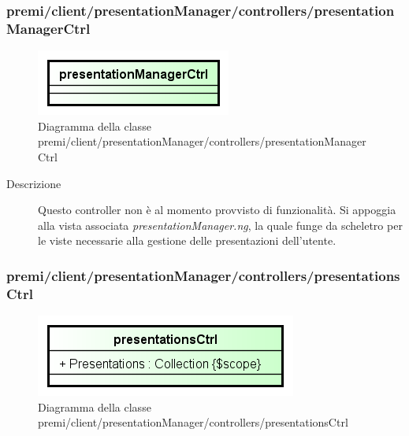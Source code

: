 \subsubsection{premi/client/presentationManager/controllers/presentationManagerCtrl}
\begin{figure}[H]
\begin{center}
\includegraphics[scale=0.90]{img/diacla/presentationManagerCtrl.png}
\caption{Diagramma della classe premi/client/presentationManager/controllers/presentationManagerCtrl}
\end{center}
\end{figure}

\begin{description}
\item[Descrizione] \hfill
	Questo controller non è al momento provvisto di funzionalità. Si appoggia alla vista associata \textit{presentationManager.ng}, la quale funge da scheletro per le viste necessarie alla gestione delle presentazioni dell'utente.
\end{description}




\subsubsection{premi/client/presentationManager/controllers/presentationsCtrl}
\begin{figure}[H]
\begin{center}
\includegraphics[scale=0.90]{img/diacla/presentationsCtrl.png}
\caption{Diagramma della classe premi/client/presentationManager/controllers/presentationsCtrl}
\end{center}
\end{figure}

